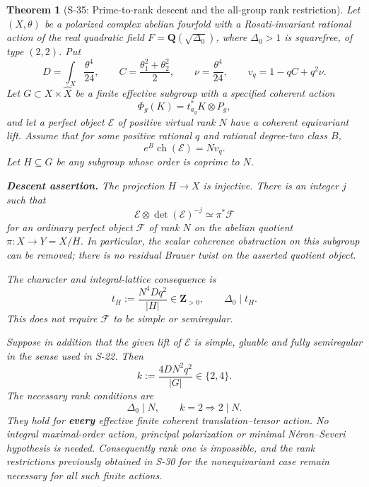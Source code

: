 \documentclass[11pt,a4paper]{article}
\newtheorem{theorem}{Theorem}[section]
\theoremstyle{definition}
\begin{document}
\begin{theorem}[S-35: Prime-to-rank descent and the all-group rank restriction]
\label{thm:semireg-prime-to-rank-descent}
Let \((X,\theta)\) be a polarized complex abelian fourfold with a Rosati-invariant rational action of the real quadratic field \(F=\mathbf Q(\sqrt{\Delta_0})\), where \(\Delta_0>1\) is squarefree, of type \((2,2)\). Put \[
 D=\int_X\frac{\theta^4}{24},\qquad
 C=\frac{\theta_1^2+\theta_2^2}{2},\qquad
 \nu=\frac{\theta^4}{24},\qquad
 v_q=1-qC+q^2\nu.
 \tag{S35.1}
\] Let \(G\subset X\times\widehat X\) be a finite effective subgroup with a specified coherent action \[
 \Phi_g(K)=t_{a_g}^*K\otimes P_g,
\] and let a perfect object \(\mathcal E\) of positive virtual rank \(N\) have a coherent equivariant lift. Assume that for some positive rational \(q\) and rational degree-two class \(B\), \[
 e^B\operatorname{ch}(\mathcal E)=Nv_q.
 \tag{S35.2}
\] Let \(H\subseteq G\) be any subgroup whose order is coprime to \(N\).

\textbf{Descent assertion.} The projection \(H\to X\) is injective. There is an integer \(j\) such that \[
 \mathcal E\otimes\det(\mathcal E)^{-j}
           \simeq\pi^*\mathcal F
 \tag{S35.3}
\] for an ordinary perfect object \(\mathcal F\) of rank \(N\) on the abelian quotient \(\pi:X\to Y=X/H\). In particular, the scalar coherence obstruction on this subgroup can be removed; there is no residual Brauer twist on the asserted quotient object.

The character and integral-lattice consequence is \[
 t_H:=\frac{N^4Dq^2}{|H|}\in\mathbf Z_{>0},
 \qquad \Delta_0\mid t_H.
 \tag{S35.4}
\] This does not require \(\mathcal F\) to be simple or semiregular.

Suppose in addition that the given lift of \(\mathcal E\) is simple, gluable and fully semiregular in the sense used in S-22. Then \[
 k:=\frac{4DN^2q^2}{|G|}\in\{2,4\}.
\] The necessary rank conditions are \[
 \boxed{\Delta_0\mid N,\qquad k=2\Longrightarrow 2\mid N.}
 \tag{S35.5}
\] They hold for \textbf{every} effective finite coherent translation--tensor action. No integral maximal-order action, principal polarization or minimal Néron--Severi hypothesis is needed. Consequently rank one is impossible, and the rank restrictions previously obtained in S-30 for the nonequivariant case remain necessary for all such finite actions.
\end{theorem}
\end{document}

